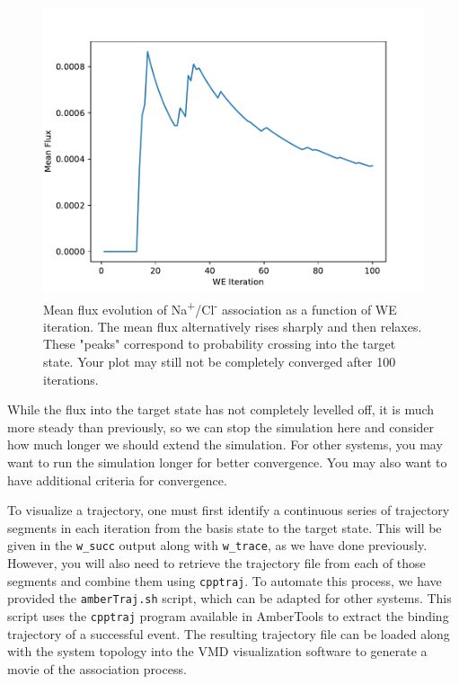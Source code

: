 \documentclass[9pt,tutorial,ASAPversion]{livecoms}
\begin{document}
\begin{figure}
\includegraphics[width=\linewidth]{Figure5.pdf}
\caption{Mean flux evolution of Na\textsuperscript{+}/Cl\textsuperscript{-} association as a function of WE iteration. 
The mean flux alternatively rises sharply and then relaxes. 
These "peaks" correspond to probability crossing into the target state. 
Your plot may still not be completely converged after 100 iterations.}
\label{fig:view}
\end{figure}

While the flux into the target state has not completely levelled off, it is much more steady than previously, so we can stop the simulation here and consider how much longer we should extend the simulation. 
For other systems, you may want to run the simulation longer for better convergence. 
You may also want to have additional criteria for convergence.

To visualize a trajectory, one must first identify a continuous series of trajectory segments in each iteration from the basis state to the target state. 
This will be given in the \verb|w_succ| output along with \verb|w_trace|, as we have done previously. 
However, you will also need to retrieve the trajectory file from each of those segments and combine them using \verb|cpptraj|. 
To automate this process, we have provided the \verb|amberTraj.sh| script, which can be adapted for other systems. 
This script uses the \verb|cpptraj| program available in AmberTools to extract the binding trajectory of a successful event.
The resulting trajectory file can be loaded along with the system topology into the VMD visualization software to generate a movie of the association process.
 
\end{document}
